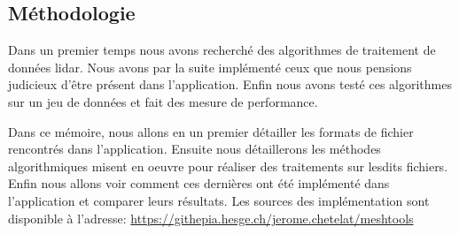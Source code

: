 \subsection*{Méthodologie}
Dans un premier temps nous avons recherché des algorithmes de
traitement de données lidar. Nous avons par la suite implémenté ceux que nous
pensions judicieux d'être présent dans l'application.
Enfin nous avons testé ces algorithmes sur un jeu de données et fait des mesure
de performance.

Dans ce mémoire, nous allons en un premier détailler les formats de fichier 
rencontrés dans l'application.
Ensuite nous détaillerons les méthodes algorithmiques misent en oeuvre pour
réaliser des traitements sur lesdits fichiers.
Enfin nous allons voir comment ces dernières ont été implémenté dans
l'application et comparer leurs résultats.
Les sources des implémentation sont disponible à l'adresse: \href{https://githepia.esge.ch/jerome.chetelat/meshtools}{https://githepia.hesge.ch/jerome.chetelat/meshtools}
